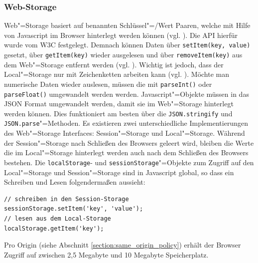 \subsubsection*{Web-Storage}
Web"=Storage basiert auf benannten Schlüssel"=/Wert Paaren, welche mit Hilfe von Javascript im Browser hinterlegt werden können (vgl. \cite{html5upandrunningchapter7}). Die \ac{API} hierfür wurde vom \ac{W3C} festgelegt. Demnach können Daten über \texttt{setItem(key, value)} gesetzt, über \texttt{getItem(key)} wieder ausgelesen und über \texttt{removeItem(key)} aus dem Web"=Storage entfernt werden (vgl. \cite{W3C2011}). Wichtig ist jedoch, dass der Local"=Storage nur mit Zeichenketten arbeiten kann (vgl. \cite{W3C2011}). Möchte man numerische Daten wieder auslesen, müssen die mit \texttt{parseInt()} oder \texttt{parseFloat()} umgewandelt werden werden. Javascript"=Objekte müssen in das \ac{JSON} Format umgewandelt werden, damit sie im Web"=Storage hinterlegt werden können. Dies funktioniert am besten über die \texttt{JSON.stringify} und \texttt{JSON.parse}"=Methoden. Es existieren zwei unterschiedliche Implementierungen des Web"=Storage Interfaces: Session"=Storage und Local"=Storage. Während der Session"=Storage nach Schließen des Browsers geleert wird, bleiben die Werte die im Local"=Storage hinterlegt werden auch nach dem Schließen des Browsers bestehen. Die \texttt{localStorage}- und \texttt{sessionStorage}"=Objekte zum Zugriff auf den Local"=Storage und Session"=Storage sind in Javascript global, so dass ein Schreiben und Lesen folgendermaßen aussieht:
\begin{lstlisting}
// schreiben in den Session-Storage
sessionStorage.setItem('key', 'value');
// lesen aus dem Local-Storage
localStorage.getItem('key');
\end{lstlisting}
Pro Origin (siehe Abschnitt \ref{section:same_origin_policy}) erhält der Browser Zugriff auf zwischen 2,5 Megabyte und 10 Megabyte Speicherplatz.

